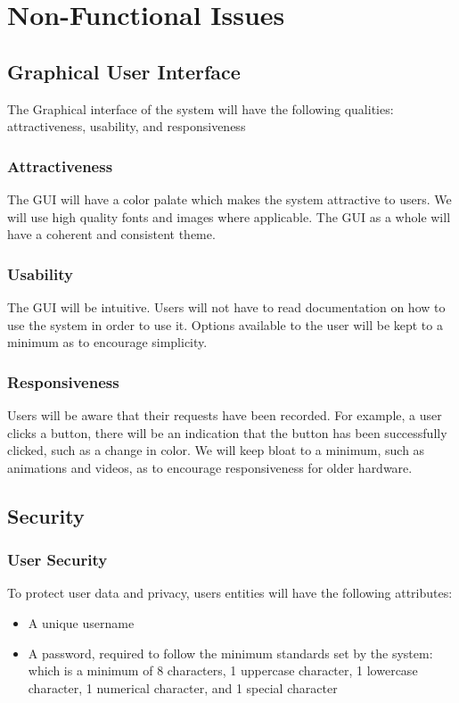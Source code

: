 \documentclass[letter, 12pt, titlepage]{article}
\begin{document}
		
	\section{Non-Functional Issues}

		\subsection{Graphical User Interface}
			The Graphical interface of the system will have the following qualities: attractiveness, usability, and responsiveness
			\subsubsection{Attractiveness}
				The GUI will have a color palate which makes the system attractive to users. We will use high quality fonts and images where applicable. The GUI as a whole will have a coherent and consistent theme. 
			\subsubsection{Usability}
				The GUI will be intuitive. Users will not have to read documentation on how to use the system in order to use it. Options available to the user will be kept to a minimum as to encourage simplicity.
			\subsubsection{Responsiveness}
				Users will be aware that their requests have been recorded. For example, a user clicks a button, there will be an indication that the button has been successfully clicked, such as a change in color. We will keep bloat to a minimum, such as animations and videos, as to encourage responsiveness for older hardware.

		\subsection{Security}
			\subsubsection{User Security}
				To protect user data and privacy, users entities will have the following attributes:
				\begin{itemize}
						\item A unique username
						\item A password, required to follow the minimum standards set by the system: which is a minimum of 8 characters, 1 uppercase character, 1 lowercase character, 1 numerical character, and 1 special character
				\end{itemize}
\end{document}
